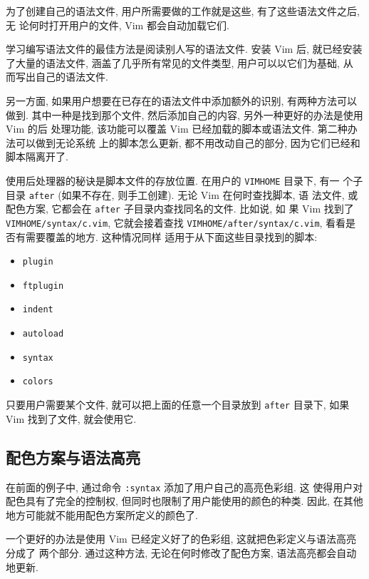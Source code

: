 为了创建自己的语法文件, 用户所需要做的工作就是这些, 有了这些语法文件之后, 无
论何时打开用户的文件, Vim 都会自动加载它们.

\begin{warning}
    学习编写语法文件的最佳方法是阅读别人写的语法文件. 安装 Vim 后, 就已经安装
    了大量的语法文件, 涵盖了几乎所有常见的文件类型, 用户可以以它们为基础, 从
    而写出自己的语法文件.
\end{warning}

另一方面, 如果用户想要在已存在的语法文件中添加额外的识别, 有两种方法可以做到.
其中一种是找到那个文件, 然后添加自己的内容, 另外一种更好的办法是使用 Vim 的后
处理功能, 该功能可以覆盖 Vim 已经加载的脚本或语法文件. 第二种办法可以做到无论系统
上的脚本怎么更新, 都不用改动自己的部分, 因为它们已经和脚本隔离开了.

使用后处理器的秘诀是脚本文件的存放位置. 在用户的 \texttt{VIMHOME} 目录下, 有一
个子目录 \texttt{after} (如果不存在, 则手工创建). 无论 Vim 在何时查找脚本, 语
法文件, 或配色方案, 它都会在 \texttt{after} 子目录内查找同名的文件. 比如说, 如
果 Vim 找到了 \texttt{VIMHOME/syntax/c.vim}, 它就会接着查找
\texttt{VIMHOME/after/syntax/c.vim}, 看看是否有需要覆盖的地方. 这种情况同样
适用于从下面这些目录找到的脚本:
\begin{itemize}
    \item \texttt{plugin}
    \item \texttt{ftplugin}
    \item \texttt{indent}
    \item \texttt{autoload}
    \item \texttt{syntax}
    \item \texttt{colors}
\end{itemize}
只要用户需要某个文件, 就可以把上面的任意一个目录放到 \texttt{after} 目录下,
如果 Vim 找到了文件, 就会使用它.

\subsection{配色方案与语法高亮}
\label{subsec:color_scheme_and_syntax_coloring}

在前面的例子中, 通过命令 \texttt{:syntax} 添加了用户自己的高亮色彩组. 这
使得用户对配色具有了完全的控制权, 但同时也限制了用户能使用的颜色的种类.
因此, 在其他地方可能就不能用配色方案所定义的颜色了.

一个更好的办法是使用 Vim 已经定义好了的色彩组, 这就把色彩定义与语法高亮分成了
两个部分. 通过这种方法, 无论在何时修改了配色方案, 语法高亮都会自动地更新.

